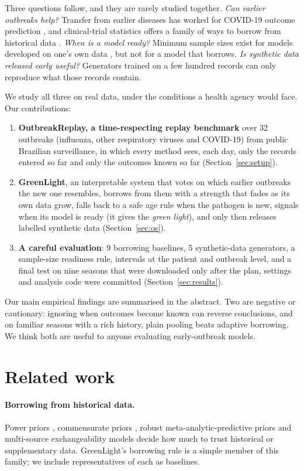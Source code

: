 \documentclass[10pt]{article}
\begin{document}
Three questions follow, and they are rarely studied together. \emph{Can earlier outbreaks help?} Transfer from
earlier diseases has worked for COVID-19 outcome prediction \citep{lichtner2021covid,agarwal2022transmed}, and
clinical-trial statistics offers a family of ways to borrow from historical data
\citep{ibrahim2000power,hobbs2011commensurate,schmidli2014rmap,kaizer2018mem}. \emph{When is a model ready?}
Minimum sample sizes exist for models developed on one's own data \citep{riley2020samplesize}, but not for a model
that borrows. \emph{Is synthetic data released early useful?} Generators trained on a few hundred records can only
reproduce what those records contain.

We study all three on real data, under the conditions a health agency would face. Our contributions:
\begin{enumerate}
\item \textbf{OutbreakReplay, a time-respecting replay benchmark} over 32 outbreaks (influenza, other respiratory viruses and
COVID-19) from public Brazilian surveillance, in which every method sees, each day, only the records entered so far
and only the outcomes known so far (Section~\ref{sec:setup}).
\item \textbf{GreenLight}, an interpretable system that votes on which earlier outbreaks the new one
resembles, borrows from them with a strength that fades as its own data grow, falls back to a safe age rule when
the pathogen is new, signals when its model is ready (it gives the \emph{green light}), and only then releases labelled
synthetic data (Section~\ref{sec:os}).
\item \textbf{A careful evaluation}: 9 borrowing baselines, 5 synthetic-data generators, a sample-size readiness
rule, intervals at the patient and outbreak level, and a final test on nine seasons that were downloaded only after
the plan, settings and analysis code were committed (Section~\ref{sec:results}).
\end{enumerate}
Our main empirical findings are summarised in the abstract. Two are negative or cautionary: ignoring when outcomes
become known can reverse conclusions, and on familiar seasons with a rich history, plain pooling beats adaptive
borrowing. We think both are useful to anyone evaluating early-outbreak models.

\section{Related work}
\paragraph{Borrowing from historical data.} Power priors \citep{ibrahim2000power}, commensurate priors
\citep{hobbs2011commensurate}, robust meta-analytic-predictive priors \citep{schmidli2014rmap} and multi-source
exchangeability models \citep{kaizer2018mem} decide how much to trust historical or supplementary data. GreenLight's
borrowing rule is a simple member of this family; we include representatives of each as baselines.
\end{document}
